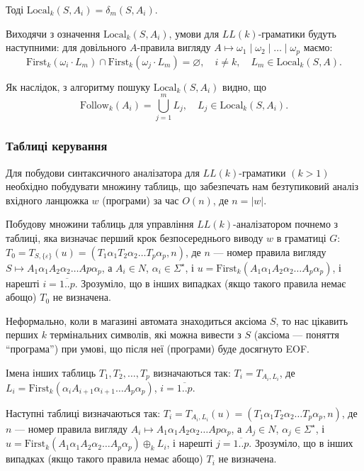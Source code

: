 Тоді $\text{Local}_k(S, A_i) = \delta_m(S, A_i)$. \medskip

Виходячи з означення $\text{Local}_k(S, A_i)$, умови для $LL(k)$-граматики будуть наступними: для довільного $A$-правила вигляду $A \mapsto \omega_1 \mid \omega_2 \mid \ldots \mid \omega_p$ маємо: \[\text{First}_k (\omega_i \cdot L_m) \cap \text{First}_k(\omega_j \cdot L_m) = \varnothing, \quad i \ne k, \quad L_m \in \text{Local}_k(S, A).\]

Як наслідок, з алгоритму пошуку $\text{Local}_k(S, A_i)$ видно, що \[ \text{Follow}_k(A_i) = \bigcup_{j = 1}^m L_j, \quad L_j \in \text{Local}_k(S, A_i).\]

\subsubsection{Таблиці керування}

Для побудови синтаксичного аналізатора для $LL(k)$-граматики $(k > 1)$ необхідно побудувати множину таблиць, що забезпечать нам безтупиковий аналіз вхідного ланцюжка $w$ (програми) за час $O(n)$, де $n = \vert w\vert$. \medskip

Побудову множини таблиць для управління $LL(k)$-аналізатором почнемо з таблиці, яка визначає перший крок безпосереднього виводу $w$ в граматиці $G$: $T_0 = T_{S, \{\varepsilon\}}(u) = (T_1\alpha_1T_2\alpha_2\ldots T_p\alpha_p, n)$, де $n$ --- номер правила вигляду $S\mapsto A_1\alpha_1A_2\alpha_2\ldots Ap\alpha_p$, а $A_i \in N$, $\alpha_i \in \Sigma^\star$, і $u = \text{First}_k(A_1\alpha_1A_2\alpha_2\ldots A_p\alpha_p)$, і нарешті $i = \overline{1..p}$. Зрозуміло, що в інших випадках (якщо такого правила немає абощо) $T_0$ не визначена. \medskip

Неформально, коли в магазині автомата знаходиться аксіома $S$, то нас цікавить перших $k$ термінальних символів, які можна вивести з $S$ (аксіома --- поняття ``програма'') при умові, що після неї (програми) буде досягнуто EOF. \medskip

Імена інших таблиць $T_1, T_2, \ldots, T_p$ визначаються так: $T_i = T_{A_i, L_i}$, де $L_i = \text{First}_k(\alpha_i A_{i + 1} \alpha_{i + 1} \ldots A_p \alpha_p)$, $i = \overline{1..p}$. \medskip

Наступні таблиці визначаються так: $T_i = T_{A_i, L_i}(u) = (T_1\alpha_1T_2\alpha_2\ldots T_p\alpha_p, n)$, де $n$ --- номер правила вигляду $A_i\mapsto A_1\alpha_1A_2\alpha_2\ldots Ap\alpha_p$, а $A_j \in N$, $\alpha_j \in \Sigma^\star$, і $u = \text{First}_k(A_1\alpha_1A_2\alpha_2\ldots A_p\alpha_p) \oplus_k L_i$, і нарешті $j = \overline{1..p}$. Зрозуміло, що в інших випадках (якщо такого правила немає абощо) $T_i$ не визначена. \medskip


